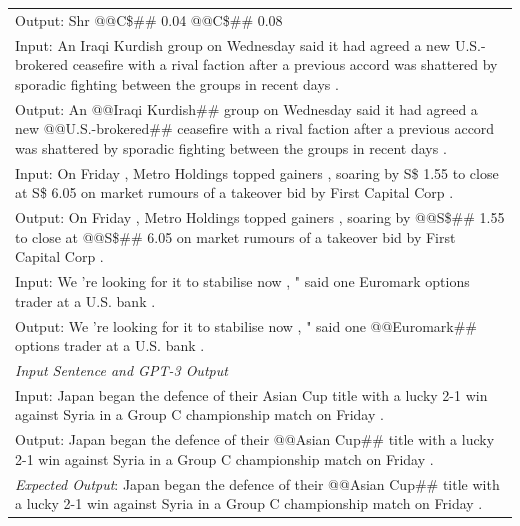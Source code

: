 \documentclass[11pt]{article}
\begin{document}
\begin{table}[th!]
{\begin{tabular}{l}
Output: Shr @@C\$\#\# 0.04 @@C\$\#\# 0.08 \\
Input: An Iraqi Kurdish group on Wednesday said it had agreed a new U.S.-brokered ceasefire with a rival faction after a previous accord was shattered by sporadic fighting between the groups in recent days . \\
Output: An @@Iraqi Kurdish\#\# group on Wednesday said it had agreed a new @@U.S.-brokered\#\# ceasefire with a rival faction after a previous accord was shattered by sporadic fighting between the groups in recent days . \\
Input: On Friday , Metro Holdings topped gainers , soaring by S\$ 1.55 to close at S\$ 6.05 on market rumours of a takeover bid by First Capital Corp . \\
Output: On Friday , Metro Holdings topped gainers , soaring by @@S\$\#\# 1.55 to close at @@S\$\#\# 6.05 on market rumours of a takeover bid by First Capital Corp . \\
Input: We 're looking for it to stabilise now , " said one Euromark options trader at a U.S. bank . \\
Output: We 're looking for it to stabilise now , " said one @@Euromark\#\# options trader at a U.S. bank . \\\midrule
\textit{Input Sentence and GPT-3 Output} \\
Input: Japan began the defence of their Asian Cup title with a lucky 2-1 win against Syria in a Group C championship match on Friday . \\
Output: Japan began the defence of their @@Asian Cup\#\# title with a lucky 2-1 win against Syria in a Group C championship match on Friday .\\
{\color{blue}\it Expected Output}: Japan began the defence of their @@Asian Cup\#\# title with a lucky 2-1 win against Syria in a Group C championship match on Friday . \\\bottomrule


\end{tabular}}
\end{table}
\end{document}
